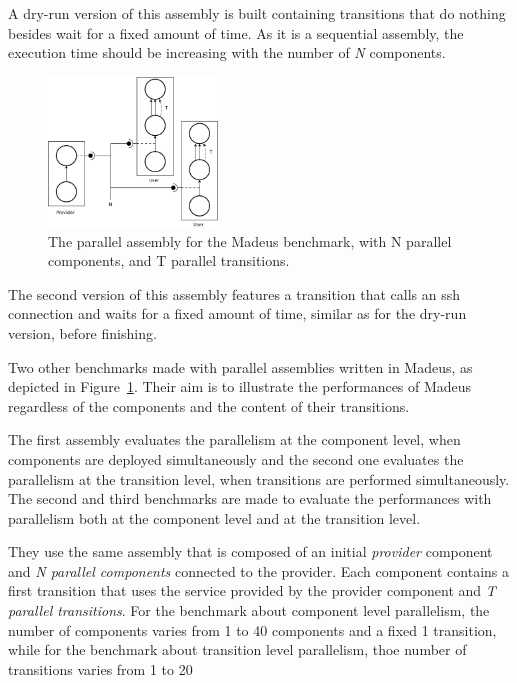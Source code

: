 A dry-run version of this assembly is built containing transitions that do nothing besides wait for a fixed amount of time. As it is a sequential assembly, the execution time should be increasing with the number of \emph{N} components.

\begin{figure}[h]
  \begin{center}
    \includegraphics[width=0.4\textwidth]{./images/par.pdf}
    \caption{The parallel assembly for the Madeus benchmark, with N parallel components, and T parallel transitions.}
    \label{fig:par}
  \end{center}
\end{figure}

The second version of this assembly features a transition that calls an ssh connection and waits for a fixed amount of time, similar as for the dry-run version, before finishing. 

Two other benchmarks made with parallel assemblies written in Madeus, as depicted in Figure~\ref{fig:par}.
Their aim is to illustrate the performances of Madeus regardless of the components and the content of their transitions.

The first assembly evaluates the parallelism at the component level, when components are deployed simultaneously and the second one evaluates the parallelism at the transition level, when transitions are performed simultaneously.
The second and third benchmarks are made to evaluate the performances with parallelism both at the component level and at the transition level.

They use the same assembly that is composed of an initial \emph{provider} component and \emph{N parallel components} connected to the provider. Each component contains a first transition that uses the service provided by the provider component and \emph{T parallel transitions}. For the benchmark about component level parallelism, the number of components varies from 1 to 40 components and a fixed 1 transition, while for the benchmark about transition level parallelism, thoe number of transitions varies from 1 to 20 %

